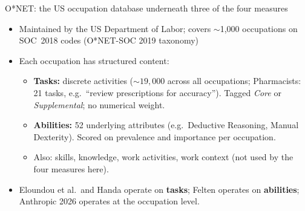 
\begin{frame}{O*NET: the US occupation database underneath three of the four measures}
\begin{itemize}\setlength{\itemsep}{6pt}
  \item Maintained by the US Department of Labor; covers $\sim$1{,}000 occupations on SOC~2018 codes (O*NET-SOC 2019 taxonomy)
  \item Each occupation has structured content:
  \begin{itemize}
    \item \textbf{Tasks:} discrete activities ($\sim 19{,}000$ across all occupations; Pharmacists: 21 tasks, e.g.\ ``review prescriptions for accuracy''). Tagged \emph{Core} or \emph{Supplemental}; no numerical weight.
    \item \textbf{Abilities:} 52 underlying attributes (e.g.\ Deductive Reasoning, Manual Dexterity). Scored on prevalence and importance per occupation.
    \item Also: skills, knowledge, work activities, work context (not used by the four measures here).
  \end{itemize}
  \item Eloundou et al.\ and Handa operate on \textbf{tasks}; Felten operates on \textbf{abilities}; Anthropic 2026 operates at the occupation level.
\end{itemize}
\end{frame}
